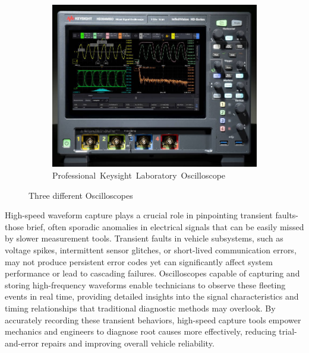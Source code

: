 \begin{figure}[ht]
  \begin{subfigure}[b]{0.7\linewidth}
    \centering
    \includegraphics[width=\linewidth]{figures/scope_keysight.jpg}
    \caption{\mbox{Professional Keysight Laboratory Oscilloscope}}
  \end{subfigure}

  \caption{Three different Oscilloscopes}
  \label{fig:scopes}
\end{figure}
High-speed waveform capture plays a crucial role in pinpointing transient faults-those brief, 
often sporadic anomalies in electrical signals that can be easily missed by slower measurement tools. 
Transient faults in vehicle subsystems, such as voltage spikes, intermittent sensor glitches, or short-lived communication errors, 
may not produce persistent error codes yet can significantly affect system performance or lead to cascading failures. 
Oscilloscopes capable of capturing and storing high-frequency waveforms enable technicians to observe these fleeting events in real time, 
providing detailed insights into the signal characteristics and timing relationships that traditional diagnostic methods may overlook. 
By accurately recording these transient behaviors, high-speed capture tools empower mechanics and engineers to diagnose root causes more effectively, 
reducing trial-and-error repairs and improving overall vehicle reliability.

